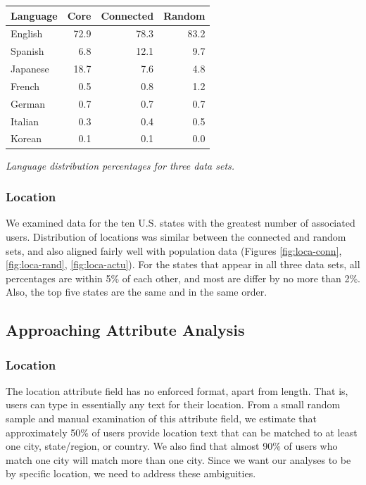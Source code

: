 \begin{center}
\begin{tabular}{| l |  r | r | r |}
\hline
\textbf{Language} & \textbf{Core} & \textbf{Connected} & \textbf{Random} \\ \hline
English & 72.9 & 78.3 & 83.2 \\ \hline
Spanish & 6.8 & 12.1 & 9.7 \\ \hline
Japanese & 18.7 & 7.6 & 4.8 \\ \hline
French & 0.5 & 0.8 & 1.2 \\ \hline
German & 0.7 & 0.7 & 0.7 \\ \hline
Italian & 0.3 & 0.4 & 0.5 \\ \hline
Korean & 0.1 &  0.1 & 0.0 \\ \hline
\end{tabular}
\end{center}
\textit{Language distribution percentages for three data sets.}\\

\subsubsection{Location}

We examined data for the ten U.S. states with the greatest number of associated users.  Distribution of locations was similar between the connected and random sets, and also aligned fairly well with population data (Figures \ref{fig:loca-conn}, \ref{fig:loca-rand}, \ref{fig:loca-actu}).  For the states that appear in all three data sets, all percentages are within 5\% of each other, and most are differ by no more than 2\%.  Also, the top five states are the same and in the same order.

\subsection{Approaching Attribute Analysis}

\subsubsection{Location}

The location attribute field has no enforced format, apart from length.  That is, users can type in essentially any text for their location.  From a small random sample and manual examination of this attribute field, we estimate that approximately 50\% of users provide location text that can be matched to at least one city, state/region, or country.  We also find that almost 90\% of users who match one city will match more than one city.  Since we want our analyses to be by specific location, we need to address these ambiguities.

